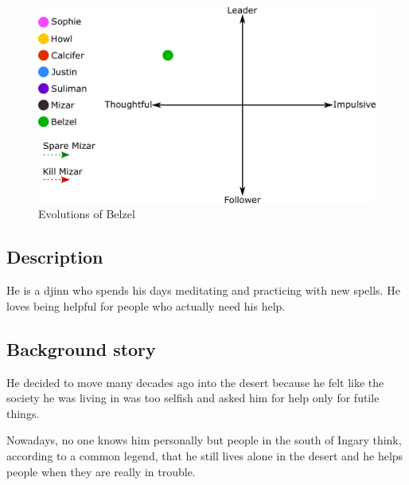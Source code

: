 \begin{figure}[H]
   \centering
   \includegraphics[width=14cm]{Images/Diagrams/Evolutions/belzelEvolution}
   \caption{Evolutions of Belzel}
\end{figure}

\subsection{Description}
He is a djinn who spends his days meditating and practicing with new spells. He loves being helpful for people who actually need his help.

\subsection{Background story}
He decided to move many decades ago into the desert because he felt like the society he was living in was too selfish and asked him for help only for futile things.

Nowadays, no one knows him personally but people in the south of Ingary think, according to a common legend, that he still lives alone in the desert and he helps people when they are really in trouble.
